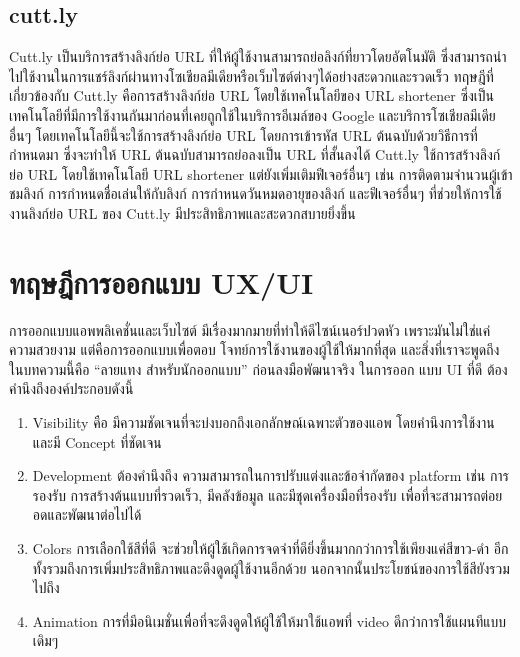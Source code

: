 \subsection{cutt.ly}
Cutt.ly เป็นบริการสร้างลิงก์ย่อ URL ที่ให้ผู้ใช้งานสามารถย่อลิงก์ที่ยาวโดยอัตโนมัติ ซึ่งสามารถนำไปใช้งานในการแชร์ลิงก์ผ่านทางโซเชียลมีเดียหรือเว็บไซต์ต่างๆได้อย่างสะดวกและรวดเร็ว
ทฤษฎีที่เกี่ยวข้องกับ Cutt.ly คือการสร้างลิงก์ย่อ URL โดยใช้เทคโนโลยีของ URL shortener ซึ่งเป็นเทคโนโลยีที่มีการใช้งานกันมาก่อนที่เคยถูกใช้ในบริการอีเมล์ของ
Google และบริการโซเชียลมีเดียอื่นๆ โดยเทคโนโลยีนี้จะใช้การสร้างลิงก์ย่อ URL โดยการเข้ารหัส URL ต้นฉบับด้วยวิธีการที่กำหนดมา ซึ่งจะทำให้ URL ต้นฉบับสามารถย่อลงเป็น URL ที่สั้นลงได้
Cutt.ly ใช้การสร้างลิงก์ย่อ URL โดยใช้เทคโนโลยี URL shortener แต่ยังเพิ่มเติมฟีเจอร์อื่นๆ เช่น การติดตามจำนวนผู้เข้าชมลิงก์
การกำหนดชื่อเล่นให้กับลิงก์ การกำหนดวันหมดอายุของลิงก์ และฟีเจอร์อื่นๆ ที่ช่วยให้การใช้งานลิงก์ย่อ URL ของ Cutt.ly มีประสิทธิภาพและสะดวกสบายยิ่งขึ้น

\section{ทฤษฎีการออกแบบ UX/UI}
การออกแบบแอพพลิเคชั่นและเว็บไซต์ มีเรื่องมากมายที่ทำให้ดีไซน์เนอร์ปวดหัว เพราะมันไม่ใช่แค่ความสวยงาม แต่คือการออกแบบเพื่อตอบ
โจทย์การใช้งานของผู้ใช้ให้มากที่สุด และสิ่งที่เราจะพูดถึงในบทความนี้คือ “ลายแทง สำหรับนักออกแบบ” ก่อนลงมือพัฒนาจริง ในการออก
แบบ UI ที่ดี ต้องคำนึงถึงองค์ประกอบดังนี้
\begin{enumerate}
  \item Visibility คือ มีความชัดเจนที่จะบ่งบอกถึงเอกลักษณ์เฉพาะตัวของแอพ โดยคำนึงการใช้งาน และมี Concept ที่ชัดเจน
  \item Development ต้องคำนึงถึง ความสามารถในการปรับแต่งและข้อจำกัดของ platform เช่น การรองรับ การสร้างต้นแบบที่รวดเร็ว, มีคลังข้อมูล และมีชุดเครื่องมือที่รองรับ เพื่อที่จะสามารถต่อยอดและพัฒนาต่อไปได้
  \item Colors การเลือกใช้สีที่ดี จะช่วยให้ผู้ใช้เกิดการจดจำที่ดียิ่งขึ้นมากกว่าการใช้เพียงแค่สีขาว-ดำ อีกทั้งรวมถึงการเพิ่มประสิทธิภาพและดึงดูดผู้ใช้งานอีกด้วย นอกจากนั้นประโยชน์ของการใช้สียังรวมไปถึง
  \item Animation การที่มีอนิเมชั่นเพื่อที่จะดึงดูดให้ผู้ใช้ให้มาใช้แอพที่ video ดีกว่าการใช้แผนทีแบบเดิมๆ
\end{enumerate}

